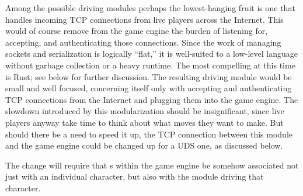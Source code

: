Among the possible driving modules perhaps the lowest-hanging fruit is one that
handles incoming TCP connections from live players across the Internet.
This would of course remove from the game engine the burden of listening for,
accepting, and authenticating those connections.
Since the work of managing sockets and serialization is logically ``flat,''
it is well-suited to a low-level language without garbage collection or a
heavy runtime.
The most compelling at this time is Rust;
see below for further discussion.
The resulting driving module would be small and well focused, concerning itself
only with accepting and authenticating TCP connections from the Internet and
plugging them into the game engine.
The slowdown introduced by this modularization should be insignificant, since
live players anyway take time to think about what moves they want to make.
But should there be a need to speed it up, the TCP connection
between this module and the game engine could be changed up for a UDS one,
as discussed below.

The change will require that s within the game engine be somehow
associated not just with an individual character, but also with the module
driving that character.